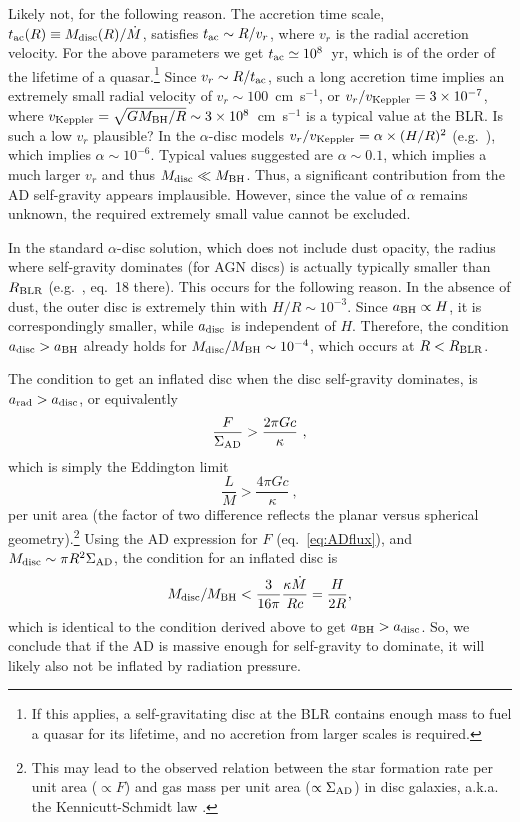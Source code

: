 \documentclass[a4paper,fleqn,usenatbib]{mnras}
\newcommand{\mdot}{\dot{M}}
\begin{document}
Likely not, for the following reason. The accretion time scale, $t_{\rm ac}(R)\equiv M_{\rm disc}(R)/\mdot$, satisfies $t_{\rm ac}\sim R/v_r$, 
where $v_r$ is the radial accretion velocity. For the above parameters we get $t_{\rm ac}\simeq 10^8$~yr,
which is of the order of the lifetime of a quasar.\footnote{If this applies, a self-gravitating disc at the BLR contains
enough mass to fuel a quasar for its lifetime, and no accretion from larger scales is required.}
Since $v_r\sim R/t_{\rm ac}$, such a long accretion time implies an extremely small radial velocity of $v_r\sim 
100$~cm~s$^{-1}$, or $v_r/v_{\rm Keppler}=3\times 10^{-7}$, where 
$v_{\rm Keppler}=\sqrt{GM_{\rm BH}/R}\sim 3\times 10^8$~cm~s$^{-1}$ is a typical value at the BLR. 
Is such a low $v_r$ plausible? In the $\alpha$-disc models
$v_r/v_{\rm Keppler}=\alpha\times (H/R)^2$ (e.g.\ \citealt*{Frank02}), which implies $\alpha\sim 10^{-6}$.
Typical values suggested are $\alpha\sim 0.1$, which implies a much larger $v_r$ and thus
$M_{\rm disc}\ll M_{\rm BH}$. Thus, a significant contribution from the AD self-gravity appears implausible.
However, since the value of $\alpha$ remains unknown, the required extremely small 
value cannot be excluded. 


In the standard \citep{SS73} $\alpha$-disc solution, which does not include dust opacity,
the radius where self-gravity dominates (for AGN discs) is actually typically smaller than $R_{\rm BLR}$
(e.g.\ \citealt{LaorNetzer89}, eq.~18 there). This occurs for the following 
reason. In the absence of dust, the outer disc is extremely thin 
with $H/R\sim 10^{-3}$. Since $a_{\rm BH}\propto H$, it is correspondingly smaller, 
while $a_{\rm disc}$ is independent of $H$. Therefore, the condition 
$a_{\rm disc}>a_{\rm BH}$ already holds for $M_{\rm disc}/M_{\rm BH}\sim 10^{-4}$, which occurs 
at $R<R_{\rm BLR}$. 



The condition to get an inflated disc when the disc self-gravity dominates,
is  $a_{\rm rad}> a_{\rm disc}$, or equivalently  
\begin{equation}
\frac{F}{\Sigma_{\rm AD}}>\frac{2\pi G c }{\kappa }\ ,
\end{equation}
which is simply the Eddington limit
\begin{equation}
\frac{L}{M}>\frac{4\pi G c }{\kappa }\ ,
\end{equation}
per unit area (the factor of two difference reflects the planar versus spherical geometry).\footnote{This may lead to the observed relation between the star formation rate per unit area ($\propto F$)
and gas mass per unit area ($\propto \Sigma_{\rm AD}$) 
in disc galaxies, a.k.a. the Kennicutt-Schmidt law \citep*{Thompson05}.}
Using the AD expression for $F$ (eq.~\ref{eq:ADflux}),
and $M_{\rm disc}\sim \pi R^2 \Sigma_{\rm AD}$, the condition for an inflated disc is
\begin{equation}
M_{\rm disc}/M_{\rm BH}<\frac{3}{16\pi}\frac{\kappa \mdot}{Rc}=\frac{H}{2R} ,
\end{equation}
which is identical to the condition derived above to get $a_{\rm BH}> a_{\rm disc}$.
So, we conclude that if the AD is massive enough for self-gravity to dominate, it will likely also 
not be inflated by radiation pressure.
\end{document}
